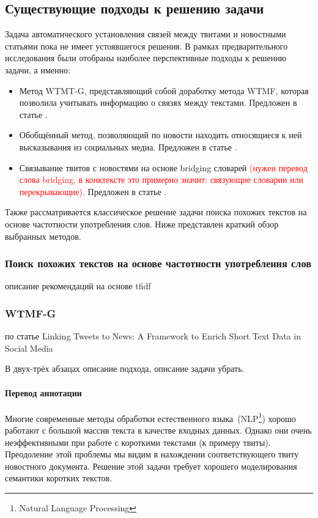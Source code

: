 \subsection{Существующие подходы к решению задачи}
    Задача автоматического установления связей между твитами и новостными статьями пока не имеет устоявшегося решения.
    В рамках предварительного исследования были отобраны наиболее перспективные подходы к решению задачи, а именно:
    \begin{itemize}
        \item Метод WTMT-G, представляющий собой доработку метода WTMF, которая позволила учитывать информацию о связях между текстами. Предложен в статье \cite{linking_base}.
        \item Обобщённый метод, позволяющий по новости находить относящиеся к ней высказывания из социальных медиа. Предложен в статье \cite{linking_news_media}.
        \item Связывание твитов с новостями на основе bridging словарей \textcolor{red}{(нужен перевод слова bridging, в конктексте это примерно значит: связующие словарии или перекрывающие)}. Предложен в статье \cite{bridging}.
    \end{itemize}
    Также рассматривается классическое решение задачи поиска похожих текстов на основе частотности употребления слов.
    Ниже представлен краткий обзор выбранных методов.

    \subsubsection{Поиск похожих текстов на основе частотности употребления слов}
        описание рекомендаций на основе tfidf

    \subsubsection{WTMF-G}
        по статье Linking Tweets to News: A Framework to Enrich Short Text Data in Social Media

        В двух-трёх абзацах описание подхода, описание задачи убрать.

        \paragraph{Перевод аннотации}
            Многие современные методы обработки естественного языка~(NLP\footnote{Natural Language Processing}) хорошо работают с большой массив текста в качестве входных данных.
            Однако они очень неэффективными при работе с короткими текстами (к примеру твиты).
            Преодоление этой проблемы мы видим в нахождении соответствующего твиту новостного документа.
            Решение этой задачи требует хорошего моделирования семантики коротких текстов.

